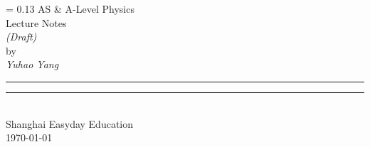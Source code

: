 \newlength{\drop}

\begingroup
\drop = 0.13\textheight
\centering
\vspace*{\drop}
{\Huge AS \& A-Level Physics}\\[\baselineskip]
{\Huge Lecture Notes}\\[1.5\baselineskip]
{\Huge\itshape (Draft)}\\[3\baselineskip]
{\Large\sc by}\\[0.5\baselineskip]
{\Large \textit{Yuhao Yang}} \\
\par
\vfill
{\color{cyan} \rule{\textwidth}{0.4pt}\vspace*{-\baselineskip}\vspace{3pt}
	\rule{\textwidth}{0.4pt}} \\[\baselineskip]
{\Large Shanghai Easyday Education} \\[0.5\baselineskip]
{\Large \today}\par
\vspace*{\drop}
\endgroup